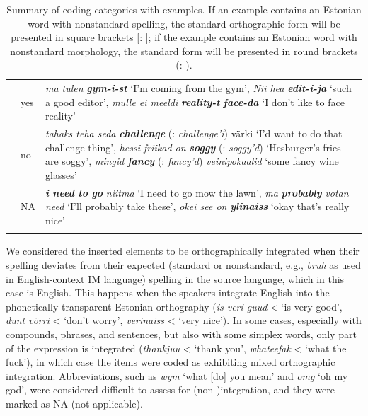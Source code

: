 \documentclass[output=paper]{langscibook}
\begin{document}
\begin{table}
\begin{tabularx}{\textwidth}{@{}l@{}lQ}
\tablevspace
{}\\
\midrule
& yes & \textit{ma tulen} \textbf{\textit{gym-i-st}} ‘I’m coming from the gym’, \textit{Nii hea} \textbf{\textit{edit-i-ja}} ‘such a good editor’, \textit{mulle ei meeldi} \textbf{\textit{reality-t}} \textbf{\textit{face-da}} ‘I don’t like to face reality’\\
& no & \textit{tahaks teha seda} \textbf{\textit{challenge} }(: \textit{challenge’i}) värki ‘I’d want to do that challenge thing’, \textit{hessi friikad on} \textbf{\textit{soggy}} (: \textit{soggy’d}) ‘Hesburger’s fries are soggy’, \textit{mingid} \textbf{\textit{fancy}} (: \textit{fancy’d}) \textit{veinipokaalid} ‘some fancy wine glasses’\\
& NA & \textbf{\textit{i} \textbf{\textit{need}} \textbf{\textit{to}} \textbf{\textit{go}} }\textit{niitma} ‘I need to go mow the lawn’, \textit{ma} \textbf{\textit{probably} }\textit{votan need} ‘I’ll probably take these’, \textit{okei see on} \textbf{\textit{ylinaiss} }‘okay that’s really nice’\\
\lspbottomrule
\end{tabularx}%
\caption{Summary of coding categories with examples. If an example contains an Estonian word with nonstandard spelling, the standard orthographic form will be presented in square brackets [: ]; if the example contains an Estonian word with nonstandard morphology, the standard form will be presented in round brackets (: ).}
\label{tab:vihmanetal:3}
\end{table}


\clearpage
We considered the inserted elements to be orthographically integrated when their spelling deviates from their expected (standard or nonstandard, e.g., \textit{bruh} as used in English-context IM language) spelling in the source language, which in this case is English. This happens when the speakers integrate English into the phonetically transparent Estonian orthography (\textit{is veri guud} < ‘is very good’, \textit{dunt vörri} < ‘don’t worry’, \textit{verinaiss} < ‘very nice’). In some cases, especially with compounds, phrases, and sentences, but also with some simplex words, only part of the expression is integrated (\textit{thankjuu} < ‘thank you’, \textit{whateefak} < ‘what the fuck’), in which case the items were coded as exhibiting mixed orthographic integration. Abbreviations, such as \textit{wym} ‘what [do] you mean’ and \textit{omg} ‘oh my god’, were considered difficult to assess for (non-)integration, and they were marked as NA (not applicable).
\end{document}

